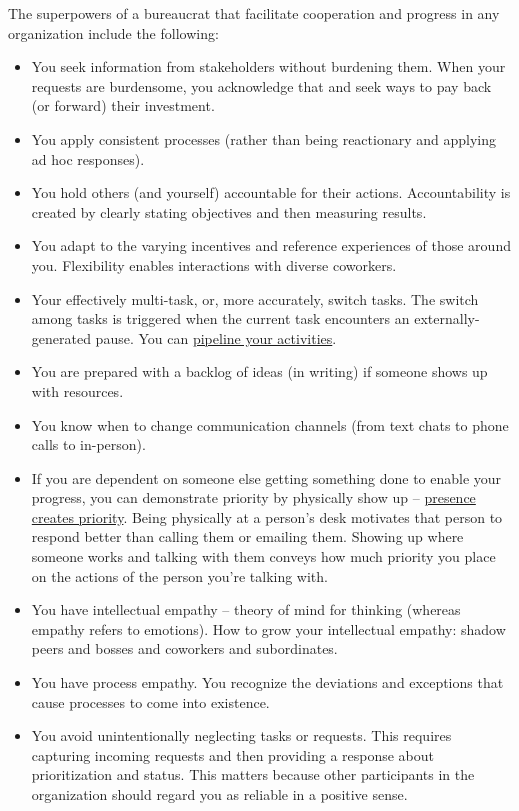 The superpowers of a bureaucrat that facilitate cooperation and progress in any organization include the following:
\begin{itemize}
\item You seek information from stakeholders without burdening them. When your requests are burdensome, you acknowledge that and seek ways to pay back (or forward) their investment.
\item You apply consistent processes (rather than being reactionary and applying ad hoc responses).
\item You hold others (and yourself) accountable for their actions. Accountability is created by clearly stating objectives and then measuring results.
\item You adapt to the varying incentives and reference experiences of those around you. Flexibility enables interactions with diverse coworkers. 
    \item Your effectively multi-task, or, more accurately, switch tasks. The switch among tasks is triggered when the current task encounters an externally-generated pause. You can \href{https://en.wikipedia.org/wiki/Pipeline_(computing)#Concept_and_motivation}{pipeline your activities}.
    \item You are prepared with a backlog of ideas (in writing) if someone shows up with resources.
    \item You know when to change communication channels (from text chats to phone calls to in-person). 
    \item If you are dependent on someone else getting something done to enable your progress, you can demonstrate priority by physically show up -- \underline{presence creates priority}. Being physically at a person's desk motivates that person to respond better than calling them or emailing them. Showing up where someone works and talking with them conveys how much priority you place on the actions of the person you're talking with.
    \item You have intellectual empathy -- theory of mind for thinking (whereas empathy refers to emotions). How to grow your intellectual empathy: shadow peers and bosses and coworkers and subordinates.
    \item You have \gls{process empathy}. You recognize the deviations and exceptions that cause processes to come into existence. 
    \item You avoid unintentionally neglecting tasks or requests. This requires capturing incoming requests and then providing a response about prioritization and status. This matters because other participants in the organization should regard you as reliable in a positive sense. 

\end{itemize}
